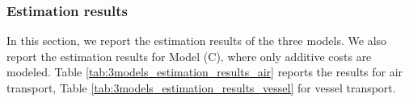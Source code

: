 \documentclass[11pt,twoside, authoryear]{elsarticle}
\begin{document}
\subsubsection{Estimation results}

In this section, we report the estimation results of the three models. We also report the estimation results for Model (C), where only additive costs are modeled. Table \ref{tab:3models_estimation_results_air} reports the results for air transport, Table \ref{tab:3models_estimation_results_vessel} for vessel transport.

\setcounter{table}{0}
\renewcommand{\thetable}{A.\arabic{table}}
\end{document}
